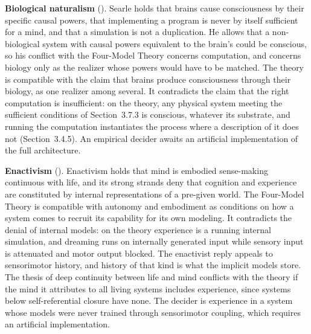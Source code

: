 \documentclass[12pt]{article}
\begin{document}
\textbf{Biological naturalism} (\citealp{Searle1980,Searle1992}). Searle holds that brains cause consciousness by their specific causal powers, that implementing a program is never by itself sufficient for a mind, and that a simulation is not a duplication. He allows that a non-biological system with causal powers equivalent to the brain's could be conscious, so his conflict with the Four-Model Theory concerns computation, and concerns biology only as the realizer whose powers would have to be matched. The theory is compatible with the claim that brains produce consciousness through their biology, as one realizer among several. It contradicts the claim that the right computation is insufficient: on the theory, any physical system meeting the sufficient conditions of Section~3.7.3 is conscious, whatever its substrate, and running the computation instantiates the process where a description of it does not (Section~3.4.5). An empirical decider awaits an artificial implementation of the full architecture.

\textbf{Enactivism} (\citealp{Varela1991,Thompson2007}). Enactivism holds that mind is embodied sense-making continuous with life, and its strong strands deny that cognition and experience are constituted by internal representations of a pre-given world. The Four-Model Theory is compatible with autonomy and embodiment as conditions on how a system comes to recruit its capability for its own modeling. It contradicts the denial of internal models: on the theory experience is a running internal simulation, and dreaming runs on internally generated input while sensory input is attenuated and motor output blocked. The enactivist reply appeals to sensorimotor history, and history of that kind is what the implicit models store. The thesis of deep continuity between life and mind conflicts with the theory if the mind it attributes to all living systems includes experience, since systems below self-referential closure have none. The decider is experience in a system whose models were never trained through sensorimotor coupling, which requires an artificial implementation.
\end{document}
